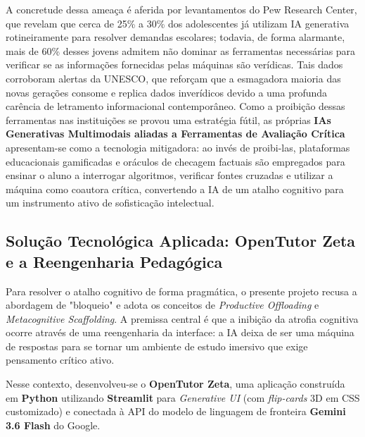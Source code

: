 A concretude dessa ameaça é aferida por levantamentos do Pew Research Center, que revelam que cerca de 25\% a 30\% dos adolescentes já utilizam IA generativa rotineiramente para resolver demandas escolares; todavia, de forma alarmante, mais de 60\% desses jovens admitem não dominar as ferramentas necessárias para verificar se as informações fornecidas pelas máquinas são verídicas. Tais dados corroboram alertas da UNESCO, que reforçam que a esmagadora maioria das novas gerações consome e replica dados inverídicos devido a uma profunda carência de letramento informacional contemporâneo. Como a proibição dessas ferramentas nas instituições se provou uma estratégia fútil, as próprias \textbf{IAs Generativas Multimodais aliadas a Ferramentas de Avaliação Crítica} apresentam-se como a tecnologia mitigadora: ao invés de proibi-las, plataformas educacionais gamificadas e oráculos de checagem factuais são empregados para ensinar o aluno a interrogar algoritmos, verificar fontes cruzadas e utilizar a máquina como coautora crítica, convertendo a IA de um atalho cognitivo para um instrumento ativo de sofisticação intelectual.

\subsection*{Solução Tecnológica Aplicada: OpenTutor Zeta e a Reengenharia Pedagógica}

Para resolver o atalho cognitivo de forma pragmática, o presente projeto recusa a abordagem de "bloqueio" e adota os conceitos de \textit{Productive Offloading} e \textit{Metacognitive Scaffolding}. A premissa central é que a inibição da atrofia cognitiva ocorre através de uma reengenharia da interface: a IA deixa de ser uma máquina de respostas para se tornar um ambiente de estudo imersivo que exige pensamento crítico ativo.

Nesse contexto, desenvolveu-se o \textbf{OpenTutor Zeta}, uma aplicação construída em \textbf{Python} utilizando \textbf{Streamlit} para \textit{Generative UI} (com \textit{flip-cards} 3D em CSS customizado) e conectada à API do modelo de linguagem de fronteira \textbf{Gemini 3.6 Flash} do Google. 

